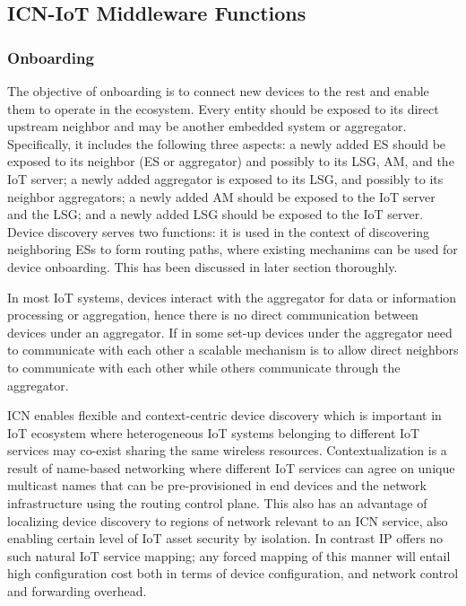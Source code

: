 \subsection{ICN-IoT Middleware Functions}
\subsubsection{Onboarding}
The objective of onboarding is to connect new devices to the rest and enable them to operate in the ecosystem. Every entity should be exposed to its direct upstream neighbor and may be another embedded system or aggregator. Specifically, it includes the following three aspects: a newly added ES should be exposed to its neighbor (ES or aggregator) and possibly to its LSG, AM, and the IoT server; a newly added aggregator is exposed to its LSG, and possibly to its neighbor aggregators; a newly added AM should be exposed to the IoT server and the LSG; and a newly added LSG should be exposed to the IoT server. Device discovery serves two functions:  it is used in the context of discovering neighboring ESs to form routing paths, where existing mechanims can be used for device onboarding. This has been discussed in later section thoroughly.
\par
In most IoT systems, devices interact with the aggregator for data or information processing or aggregation, hence there is no direct communication between devices under an aggregator. If in some set-up devices under the aggregator need to communicate with each other a scalable mechanism is to allow direct neighbors to communicate with each other while others communicate through the aggregator.\par
ICN enables flexible and context-centric device discovery which is important in IoT ecosystem where heterogeneous IoT systems belonging to different IoT services may co-exist sharing the same wireless resources. Contextualization is a result of name-based networking where different IoT services can agree on unique multicast names that can be pre-provisioned in end devices and the network infrastructure using the routing control plane. This also has an advantage of localizing device discovery to regions of network relevant to an ICN service, also enabling certain level of IoT asset security by isolation. In contrast IP offers no such natural IoT service mapping; any forced mapping of this manner will entail high configuration cost both in terms of device configuration, and network control and forwarding overhead.
